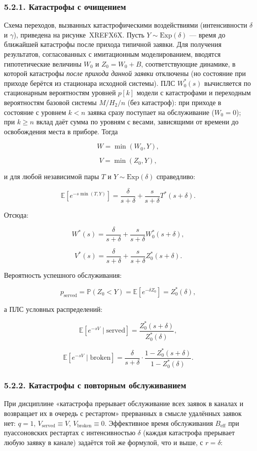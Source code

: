 \subsubsection*{5.2.1. Катастрофы с очищением}
Схема переходов, вызванных катастрофическими воздействиями (интенсивности \(\delta\) и \(\gamma\)), приведена на рисунке~XREFX6X.
Пусть \(Y\sim\mathrm{Exp}(\delta)\) --- время до ближайшей катастрофы после прихода типичной заявки. Для получения результатов, согласованных с имитационным моделированием, вводятся гипотетические величины \(W_0\) и \(Z_0=W_0+B\), соответствующие динамике, в которой катастрофы \emph{после прихода данной заявки} отключены (но состояние при приходе берётся из стационара исходной системы). ПЛС \(W_0^*(s)\) вычисляется по стационарным вероятностям уровней \(p[k]\) модели с катастрофами и переходным вероятностям базовой системы \(M/H_2/n\) (без катастроф): при приходе в состояние с уровнем \(k<n\) заявка сразу поступает на обслуживание (\(W_0=0\)); при \(k\ge n\) вклад даёт сумма по уровням с весами, зависящими от времени до освобождения места в приборе. Тогда


\[W=\min(W_0,Y),\]

\[V=\min(Z_0,Y),\]


и для любой независимой пары \(T\) и \(Y\sim\mathrm{Exp}(\delta)\) справедливо:


\[\mathbb{E}[e^{-s\min(T,Y)}]=\frac{\delta}{s+\delta}+\frac{s}{s+\delta}T^*(s+\delta).\]


Отсюда:


\[W^*(s)=\frac{\delta}{s+\delta}+\frac{s}{s+\delta}W_0^*(s+\delta),\]

\[V^*(s)=\frac{\delta}{s+\delta}+\frac{s}{s+\delta}Z_0^*(s+\delta).\]


Вероятность успешного обслуживания:


\[p_{\text{served}}=\mathbb{P}(Z_0<Y)=\mathbb{E}[e^{-\delta Z_0}]=Z_0^*(\delta),\]


а ПЛС условных распределений:


\[\mathbb{E}[e^{-sV}\mid \text{served}]=\frac{Z_0^*(s+\delta)}{Z_0^*(\delta)},\]

\[\mathbb{E}[e^{-sV}\mid \text{broken}]=\frac{\delta}{s+\delta}\cdot\frac{1-Z_0^*(s+\delta)}{1-Z_0^*(\delta)}.\]



\subsubsection*{5.2.2. Катастрофы с повторным обслуживанием}
При дисциплине «катастрофа прерывает обслуживание всех заявок в каналах и возвращает их в очередь с рестартом» прерванных в смысле удалённых заявок нет: \(q=1\), \(V_{\text{served}}\equiv V\), \(V_{\text{broken}}\equiv 0\). Эффективное время обслуживания \(B_{\mathrm{eff}}\) при пуассоновских рестартах с интенсивностью \(\delta\) (каждая катастрофа прерывает любую заявку в канале) задаётся той же формулой, что и выше, с \(r=\delta\):


